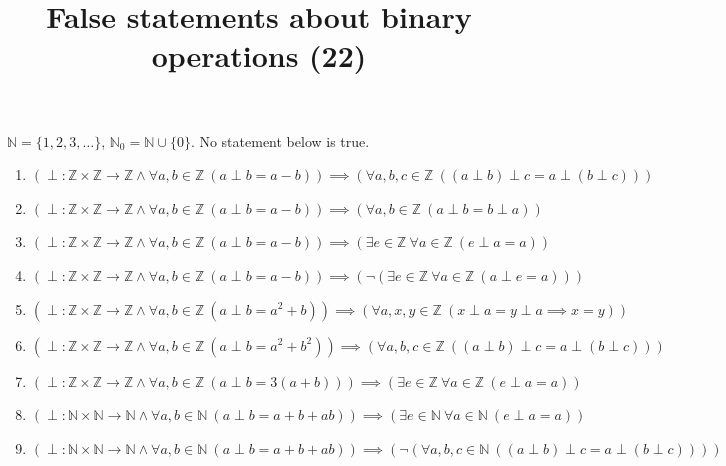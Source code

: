 \documentclass[11pt,a4paper]{article}
\title{False statements about binary operations (22)}
\author{}
\date{}
\begin{document}
\maketitle
$\mathbb{N} = \{1, 2, 3, \ldots\}$, $\mathbb{N}_{0} = \mathbb{N} \cup \{0\}$. No statement below is true.

\begin{enumerate}
\item $\displaystyle (\perp \colon \mathbb{Z} \times \mathbb{Z} \to \mathbb{Z} \land \forall a, b \in \mathbb{Z}\ (a \perp b = a - b)) \implies (\forall a, b, c \in \mathbb{Z}\ ((a \perp b) \perp c = a \perp (b \perp c)))$
\item $\displaystyle (\perp \colon \mathbb{Z} \times \mathbb{Z} \to \mathbb{Z} \land \forall a, b \in \mathbb{Z}\ (a \perp b = a - b)) \implies (\forall a, b \in \mathbb{Z}\ (a \perp b = b \perp a))$
\item $\displaystyle (\perp \colon \mathbb{Z} \times \mathbb{Z} \to \mathbb{Z} \land \forall a, b \in \mathbb{Z}\ (a \perp b = a - b)) \implies (\exists e \in \mathbb{Z}\ \forall a \in \mathbb{Z}\ (e \perp a = a))$
\item $\displaystyle (\perp \colon \mathbb{Z} \times \mathbb{Z} \to \mathbb{Z} \land \forall a, b \in \mathbb{Z}\ (a \perp b = a - b)) \implies (\lnot (\exists e \in \mathbb{Z}\ \forall a \in \mathbb{Z}\ (a \perp e = a)))$
\item $\displaystyle (\perp \colon \mathbb{Z} \times \mathbb{Z} \to \mathbb{Z} \land \forall a, b \in \mathbb{Z}\ (a \perp b = a^{2} + b)) \implies (\forall a, x, y \in \mathbb{Z}\ (x \perp a = y \perp a \implies x = y))$
\item $\displaystyle (\perp \colon \mathbb{Z} \times \mathbb{Z} \to \mathbb{Z} \land \forall a, b \in \mathbb{Z}\ (a \perp b = a^{2} + b^{2})) \implies (\forall a, b, c \in \mathbb{Z}\ ((a \perp b) \perp c = a \perp (b \perp c)))$
\item $\displaystyle (\perp \colon \mathbb{Z} \times \mathbb{Z} \to \mathbb{Z} \land \forall a, b \in \mathbb{Z}\ (a \perp b = 3(a + b))) \implies (\exists e \in \mathbb{Z}\ \forall a \in \mathbb{Z}\ (e \perp a = a))$
\item $\displaystyle (\perp \colon \mathbb{N} \times \mathbb{N} \to \mathbb{N} \land \forall a, b \in \mathbb{N}\ (a \perp b = a + b + ab)) \implies (\exists e \in \mathbb{N}\ \forall a \in \mathbb{N}\ (e \perp a = a))$
\item $\displaystyle (\perp \colon \mathbb{N} \times \mathbb{N} \to \mathbb{N} \land \forall a, b \in \mathbb{N}\ (a \perp b = a + b + ab)) \implies (\lnot (\forall a, b, c \in \mathbb{N}\ ((a \perp b) \perp c = a \perp (b \perp c))))$

\end{enumerate}
\end{document}

